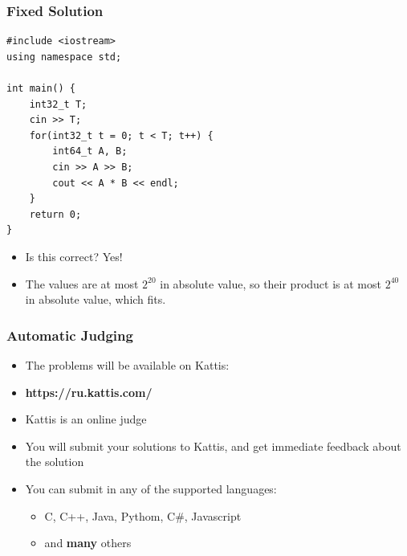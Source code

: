 \documentclass{beamer}
\begin{document}
\begin{frame}
    \frametitle{Fixed Solution}
	\begin{scriptsize}
        \begin{verbatim}
#include <iostream>
using namespace std;

int main() {
    int32_t T;
    cin >> T;
    for(int32_t t = 0; t < T; t++) {
        int64_t A, B;
        cin >> A >> B;
        cout << A * B << endl;
    }
    return 0;
}
        \end{verbatim}
    \end{scriptsize}
    \begin{itemize}
       \item<2-> Is this correct?  {\alert{Yes!}}
       \item<3-> The values are at most $2^{20}$ in absolute value, so their product is at most $2^{40}$ in absolute value, which fits. 
    \end{itemize}
\end{frame}

\begin{frame}[plain]
    \frametitle{Automatic Judging}
    \begin{itemize}
        \item The problems will be available on \alert{Kattis}:
        \item \textbf{https://ru.kattis.com/}
        \vspace{20pt}
        \item Kattis is an online judge
        \item You will submit your solutions to Kattis, and get immediate feedback about the solution
        \item You can submit in any of the supported languages:
        \begin{itemize}
            \item C, C++, Java, Pythom, C\#{}, Javascript
            \item and \textbf{many} others
        \end{itemize}
    \end{itemize}
\end{frame}
\end{document}
